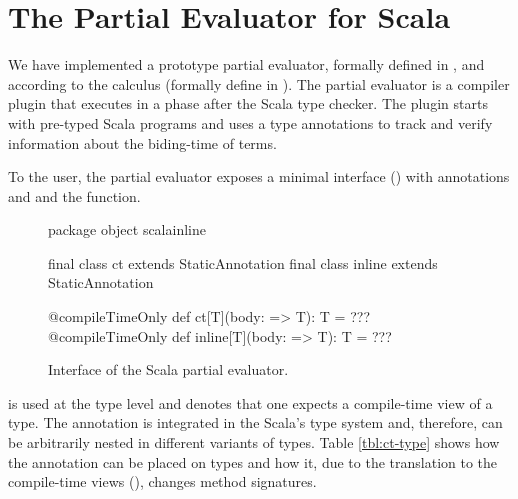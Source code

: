 \section{The Partial Evaluator for Scala}
\label{sct:interface}

We have implemented a prototype partial evaluator, formally defined in , and
 according to the \calculus calculus (formally define in ).
 The partial evaluator is a compiler plugin that executes in a phase after the
 Scala type checker. The plugin starts with pre-typed Scala programs and uses a
 type annotations  to track and verify information about the biding-time
 of terms.

To the user, the partial evaluator exposes a minimal interface () with
annotations  and  and the  function.

\begin{figure}
\begin{listing}
package object scalainline {

  final class ct extends StaticAnnotation
  final class inline extends StaticAnnotation

  @compileTimeOnly def ct[T](body: => T): T = ???
  @compileTimeOnly def inline[T](body: => T): T = ???

}
\end{listing}
\label{fig:interface}
\caption{Interface of the Scala partial evaluator.}
\end{figure}

 is used at the type level and denotes that one expects a
 compile-time view of a type. The annotation is integrated in the Scala's type system
 and, therefore, can be arbitrarily nested in different variants of types. Table
 \ref{tbl:ct-type} shows how the  annotation can be placed on types
 and how it, due to the translation to the compile-time views (),
 changes method signatures.

